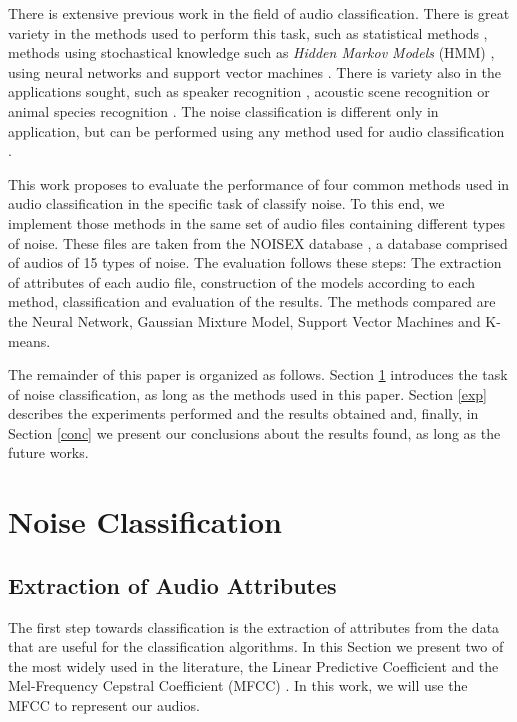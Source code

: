 \documentclass[12pt]{article}
\begin{document}
There is extensive previous work in the field of audio classification. There is great variety in the methods used to perform this task, such as statistical methods \cite{dal1988acoustic,peltonen2002computational}, methods using stochastical knowledge such as \textit{Hidden Markov Models} (HMM) \cite{ma2003context}, using neural networks \cite{beritelli2005adaptive} and support vector machines \cite{cumani2012analysis}. There is variety also in the applications sought, such as speaker recognition \cite{kinnunen2010overview,murty2006combining,farrell1994speaker}, acoustic scene recognition \cite{piczak2015environmental,barchiesi2015acoustic} or animal species recognition \cite{somervuo2006parametric,lee2008automatic}. The noise classification is different only in application, but can be performed using any method used for audio classification \cite{beritelli2007adaptive,ma2006acoustic}.

This work proposes to evaluate the performance of four common methods used in audio classification in the specific task of classify noise. To this end, we implement those methods in the same set of audio files containing different types of noise. These files are taken from the NOISEX database \cite{varga1993assessment}, a database comprised of audios of 15 types of noise. The evaluation follows these steps: The extraction of attributes of each audio file, construction of the models according to each method, classification and evaluation of the results. The methods compared are the Neural Network, Gaussian Mixture Model, Support Vector Machines and K-means.

The remainder of this paper is organized as follows. Section \ref{class} introduces the task of noise classification, as long as the methods used in this paper. Section \ref{exp} describes the experiments performed and the results obtained and, finally, in Section \ref{conc} we present our conclusions about the results found, as long as the future works.

\section{Noise Classification} \label{class}


\subsection{Extraction of Audio Attributes} \label{class:audioatt}

The first step towards classification is the extraction of attributes from the data that are useful for the classification algorithms. In this Section we present two of the most widely used in the literature, the Linear Predictive Coefficient \cite{Rabiner:1993:FSR:153687} and the Mel-Frequency Cepstral Coefficient (MFCC) \cite{xu2005automatic}. In this work, we will use the MFCC to represent our audios.
\end{document}

